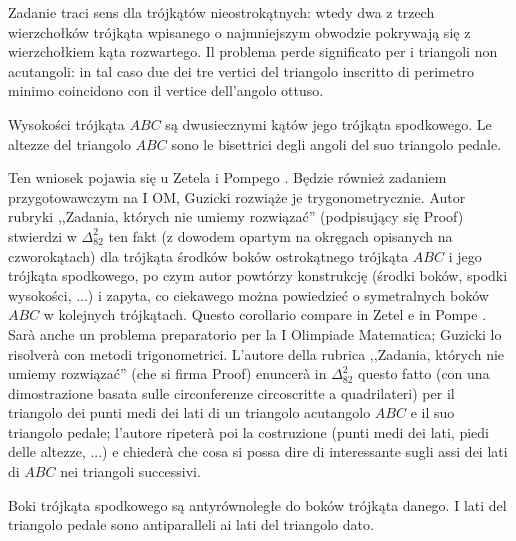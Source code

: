 Zadanie traci sens dla trójkątów nieostrokątnych: wtedy dwa z trzech wierzchołków trójkąta wpisanego o najmniejszym obwodzie pokrywają się z wierzchołkiem kąta rozwartego. %
Il problema perde significato per i triangoli non acutangoli: in tal caso due dei tre vertici del triangolo inscritto di perimetro minimo coincidono con il vertice dell'angolo ottuso. %

\begin{corollary}
	Wysokości trójkąta $ABC$ są dwusiecznymi kątów jego trójkąta spodkowego. %
	Le altezze del triangolo $ABC$ sono le bisettrici degli angoli del suo triangolo pedale. %
\end{corollary}

Ten wniosek pojawia się u Zetela \cite[s. 89]{zetel_2020} i Pompego \cite[s. 19]{pompe_2022}. %
Będzie również zadaniem przygotowawczym na I OM, Guzicki \cite[s. 351]{guzicki_2021} rozwiąże je trygonometrycznie. %
Autor rubryki ,,Zadania, których nie umiemy rozwiązać'' (podpisujący się Proof) stwierdzi w $\Delta_{82}^{2}$ ten fakt (z dowodem opartym na okręgach opisanych na czworokątach) dla trójkąta środków boków ostrokątnego trójkąta $ABC$ i jego trójkąta spodkowego, po czym autor powtórzy konstrukcję (środki boków, spodki wysokości, ...) i zapyta, co ciekawego można powiedzieć o symetralnych boków $ABC$ w kolejnych trójkątach. %
Questo corollario compare in Zetel \cite[p.~89]{zetel_2020} e in Pompe \cite[p.~19]{pompe_2022}. %
Sarà anche un problema preparatorio per la I Olimpiade Matematica; Guzicki \cite[p.~351]{guzicki_2021} lo risolverà con metodi trigonometrici. %
L'autore della rubrica ,,Zadania, których nie umiemy rozwiązać'' (che si firma Proof) enuncerà in $\Delta_{82}^{2}$ questo fatto (con una dimostrazione basata sulle circonferenze circoscritte a quadrilateri) per il triangolo dei punti medi dei lati di un triangolo acutangolo $ABC$ e il suo triangolo pedale; l'autore ripeterà poi la costruzione (punti medi dei lati, piedi delle altezze, ...) e chiederà che cosa si possa dire di interessante sugli assi dei lati di $ABC$ nei triangoli successivi. %

\begin{proposition}
    Boki trójkąta spodkowego są antyrównoległe do boków trójkąta danego. %
    I lati del triangolo pedale sono antiparalleli ai lati del triangolo dato. %
\end{proposition}

